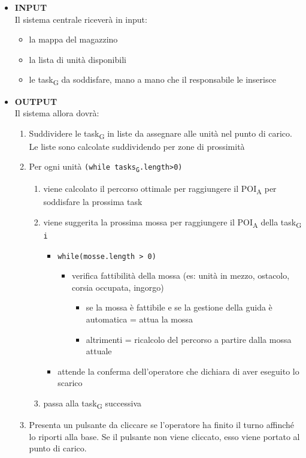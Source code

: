 \begin{itemize}
	\item{\textbf{INPUT}\\
	Il sistema centrale riceverà in input:
	\begin{itemize}
		\item{la mappa del magazzino}
		\item{la lista di unità disponibili}
		\item{le \gls{task}\textsubscript{G} da soddisfare, mano a mano che il responsabile le inserisce}
	\end{itemize}
	}
	\item{\textbf{OUTPUT}\\
	Il sistema allora dovrà:
	\begin{enumerate}
		\item{Suddividere le \gls{task}\textsubscript{G} in liste da assegnare alle unità nel punto di carico. \\
		Le liste sono calcolate suddividendo per zone di prossimità}
		\item{Per ogni unità \texttt{(while \glspl{task}\textsubscript{G}.length>0)}}
		\begin{enumerate}
			\item{viene calcolato il percorso ottimale per raggiungere il \acrshort{POI}\textsubscript{A} per soddisfare la prossima task}
			\item{viene suggerita la prossima mossa per raggiungere il \acrshort{POI}\textsubscript{A} della \gls{task}\textsubscript{G} \texttt{i}}	
			\begin{itemize}
				\item{\texttt{while(mosse.length > 0)}}
				\begin{itemize}
					\item{verifica fattibilità della mossa (es: unità in mezzo, ostacolo, corsia occupata, ingorgo)}
					\begin{itemize}
						\item{se la mossa è fattibile e se la gestione della guida è automatica =
						 attua la mossa}
						\item{altrimenti =
						ricalcolo del percorso a partire dalla mossa attuale}									\end{itemize}
				\end{itemize}				
				\item{attende la conferma dell'operatore che dichiara di aver eseguito lo scarico}
			\end{itemize}						
			\item{passa alla \gls{task}\textsubscript{G} successiva}				
		\end{enumerate}
		\item{Presenta un pulsante da cliccare se l'operatore ha finito il turno affinché lo riporti alla base. Se il pulsante non viene cliccato, esso viene portato al punto di carico. }
	\end{enumerate}
	}
\end{itemize}
